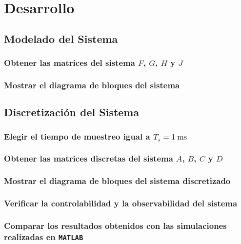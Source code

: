 \section{Desarrollo}

\subsection{Modelado del Sistema}
\subsubsection{Obtener las matrices del sistema $F$, $G$, $H$ y $J$}

\subsubsection{Mostrar el diagrama de bloques del sistema}

\subsection{Discretización del Sistema}

\subsubsection{Elegir el tiempo de muestreo igual a $T_s = 1~\text{ms}$}

\subsubsection{Obtener las matrices discretas del sistema $A$, $B$, $C$ y $D$}

\subsubsection{Mostrar el diagrama de bloques del sistema discretizado}

\subsubsection{Verificar la controlabilidad y la observabilidad del sistema}

\subsubsection{Comparar los resultados obtenidos con las simulaciones realizadas en \texttt{MATLAB}}



